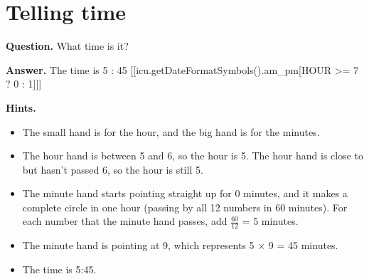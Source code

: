 \documentclass{article}
\begin{document}
\section*{Telling time}
\textbf{Question.} What time is it?

\textbf{Answer.} The time is 5 : 45 [[icu.getDateFormatSymbols().am\_pm[HOUR >= 7 ? 0 : 1]]]

\textbf{Hints.}
\begin{itemize}
  \item The small hand is for the hour, and the big hand is for the minutes.
  \item The hour hand is between 5 and 6, so the hour is 5.
                    The hour hand is close to but hasn't passed 6, so the hour is still 5.
  \item The minute hand starts pointing straight up for 0 minutes, and it makes a complete circle in one hour (passing by all 12 numbers in 60 minutes).
                    For each number that the minute hand passes, add $\frac{60}{12}$ = 5 minutes.
  \item The minute hand is pointing at 9, which represents 5 $\times$ 9 = 45 minutes.
  \item The time is 5:45.
\end{itemize}
\end{document}
